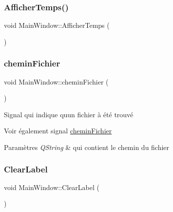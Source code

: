 \mbox{\label{class_main_window_a33811a52abf8f1ce71ec4e150d9c9ac8}} 
\subsubsection{\texorpdfstring{Afficher\+Temps()}{AfficherTemps()}}
{\footnotesize\ttfamily void Main\+Window\+::\+Afficher\+Temps (\begin{DoxyParamCaption}{ }\end{DoxyParamCaption})}

\mbox{\label{class_main_window_a397116dafcb548fec351091cc025b822}} 
\subsubsection{\texorpdfstring{chemin\+Fichier}{cheminFichier}}
{\footnotesize\ttfamily void Main\+Window\+::chemin\+Fichier (\begin{DoxyParamCaption}\item[{Q\+String}]{ }\end{DoxyParamCaption})\hspace{0.3cm}{\ttfamily [signal]}}



Signal qui indique qu\textquotesingle{}un fichier à été trouvé 

\begin{DoxySeeAlso}{Voir également}
signal \hyperlink{class_main_window_a397116dafcb548fec351091cc025b822}{chemin\+Fichier} 
\end{DoxySeeAlso}

\begin{DoxyParams}{Paramètres}
{\em Q\+String} & qui contient le chemin du fichier \\
\hline
\end{DoxyParams}
\mbox{\label{class_main_window_a9a0c33e6e696ffc763560205f992650d}} 
\subsubsection{\texorpdfstring{Clear\+Label}{ClearLabel}}
{\footnotesize\ttfamily void Main\+Window\+::\+Clear\+Label (\begin{DoxyParamCaption}{ }\end{DoxyParamCaption})\hspace{0.3cm}{\ttfamily [signal]}}



